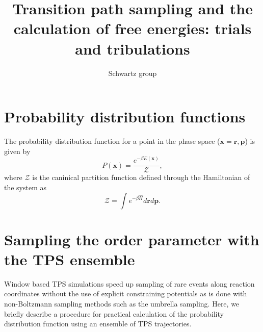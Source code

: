 \documentclass{article}
\title{Transition path sampling and the calculation of free energies: trials and tribulations}
\author{Schwartz group}
\begin{document}
\maketitle
\section*{Probability distribution functions}

The probability distribution function for a point in the phase space ($\mathbf{x} = {\mathbf{r,p}}$) is given by 
\begin{equation}
P(\mathbf{x}) = \frac{e^{-\beta E(\mathbf{x})}}{\mathcal{Z}},
\end{equation}
where $\mathcal{Z}$ is the caninical partition function defined through the 
Hamiltonian of the system as 
\begin{equation}
\mathcal{Z} = \int e^{-\beta\hat{H}} d\mathbf{r}d\mathbf{p}.
\end{equation}

\section*{Sampling the order parameter with the TPS ensemble}
Window based TPS simulations speed up sampling of rare events along reaction coordinates
without the use of explicit constraining potentials as is done with non-Boltzmann sampling 
methods such as the umbrella sampling. Here, we briefly describe a procedure for practical calculation of the probability distribution function using an ensemble of TPS trajectories.
\end{document}
